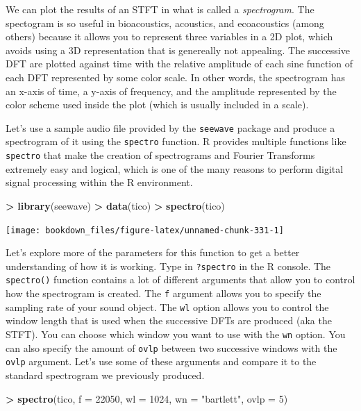 \documentclass[
]{krantz}
\makeatletter
\newenvironment{Shaded}{\begin{snugshade}}{\end{snugshade}}
\newcommand{\DataTypeTok}[1]{\textcolor[rgb]{0.27,0.27,0.27}{#1}}
\newcommand{\DecValTok}[1]{\textcolor[rgb]{0.06,0.06,0.06}{#1}}
\newcommand{\KeywordTok}[1]{\textcolor[rgb]{0.27,0.27,0.27}{\textbf{#1}}}
\newcommand{\NormalTok}[1]{#1}
\newcommand{\OperatorTok}[1]{\textcolor[rgb]{0.43,0.43,0.43}{\textbf{#1}}}
\newcommand{\StringTok}[1]{\textcolor[rgb]{0.5,0.5,0.5}{#1}}
\newenvironment{kframe}{%
\medskip{}
\setlength{\fboxsep}{.8em}
 \def\at@end@of@kframe{}%
 \ifinner\ifhmode%
  \def\at@end@of@kframe{\end{minipage}}%
  \begin{minipage}{\columnwidth}%
 \fi\fi%
 \def\FrameCommand##1{\hskip\@totalleftmargin \hskip-\fboxsep
 \colorbox{shadecolor}{##1}\hskip-\fboxsep
     \hskip-\linewidth \hskip-\@totalleftmargin \hskip\columnwidth}%
 \MakeFramed {\advance\hsize-\width
   \@totalleftmargin\z@ \linewidth\hsize
   \@setminipage}}%
 {\par\unskip\endMakeFramed%
 \at@end@of@kframe}
\renewenvironment{Shaded}{\begin{kframe}}{\end{kframe}}
\makeatother
\begin{document}
We can plot the results of an STFT in what is called a \emph{spectrogram}. The spectogram is so useful in bioacoustics, acoustics, and ecoacoustics (among others) because it allows you to represent three variables in a 2D plot, which avoids using a 3D representation that is genereally not appealing. The successive DFT are plotted against time with the relative amplitude of each sine function of each DFT represented by some color scale. In other words, the spectrogram has an x-axis of time, a y-axis of frequency, and the amplitude represented by the color scheme used inside the plot (which is usually included in a scale).

Let's use a sample audio file provided by the \texttt{seewave} package and produce a spectrogram of it using the \texttt{spectro} function. R provides multiple functions like \texttt{spectro} that make the creation of spectrograms and Fourier Transforms extremely easy and logical, which is one of the many reasons to perform digital signal processing within the R environment.

\begin{Shaded}
\begin{Highlighting}[]
\OperatorTok{\textgreater{}}\StringTok{ }\KeywordTok{library}\NormalTok{(seewave)}
\OperatorTok{\textgreater{}}\StringTok{ }\KeywordTok{data}\NormalTok{(tico)}
\OperatorTok{\textgreater{}}\StringTok{ }\KeywordTok{spectro}\NormalTok{(tico)}
\end{Highlighting}
\end{Shaded}

\texttt{[image: bookdown\_files/figure-latex/unnamed-chunk-331-1]}

Let's explore more of the parameters for this function to get a better understanding of how it is working. Type in \texttt{?spectro} in the R console. The \texttt{spectro()} function contains a lot of different arguments that allow you to control how the spectrogram is created. The \texttt{f} argument allows you to specify the sampling rate of your sound object. The \texttt{wl} option allows you to control the window length that is used when the successive DFTs are produced (aka the STFT). You can choose which window you want to use with the \texttt{wn} option. You can also specify the amount of \texttt{ovlp} between two successive windows with the \texttt{ovlp} argument. Let's use some of these arguments and compare it to the standard spectrogram we previously produced.

\begin{Shaded}
\begin{Highlighting}[]
\OperatorTok{\textgreater{}}\StringTok{ }\KeywordTok{spectro}\NormalTok{(tico, }\DataTypeTok{f =} \DecValTok{22050}\NormalTok{, }\DataTypeTok{wl =} \DecValTok{1024}\NormalTok{, }\DataTypeTok{wn =} \StringTok{"bartlett"}\NormalTok{, }\DataTypeTok{ovlp =} \DecValTok{5}\NormalTok{)}
\end{Highlighting}
\end{Shaded}
\end{document}
